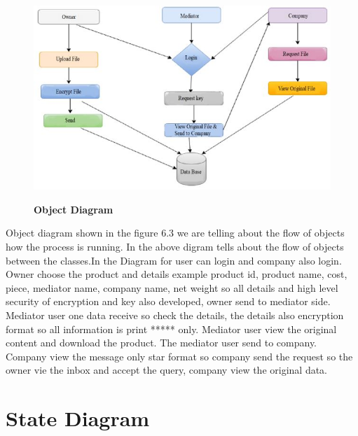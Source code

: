 \documentclass[BTech]{srmuthesis}
\begin{document}
\begin{figure}[H]
\centering
\includegraphics[scale=0.8]{object.jpg}
\label{fig:1}\hspace{10mm}
\caption{\textbf{Object Diagram}}
\end{figure}
Object diagram shown in the figure 6.3 we are telling about the flow of objects how the process is running. In the above digram tells about the flow of objects between the classes.In the Diagram for user can login and company also login. Owner choose the product and details example product id, product name, cost, piece, mediator name, company name, net weight so all details and high level security of encryption and key also developed,  owner  send to mediator side. Mediator user one data receive so check the details, the details also encryption format so all information is print ***** only.    Mediator user view the original content and download the product. The mediator user send to company. Company view the message only star format so company send the request so the owner vie the inbox and accept the query, company view the original data.
\section{State Diagram}
\end{document}
